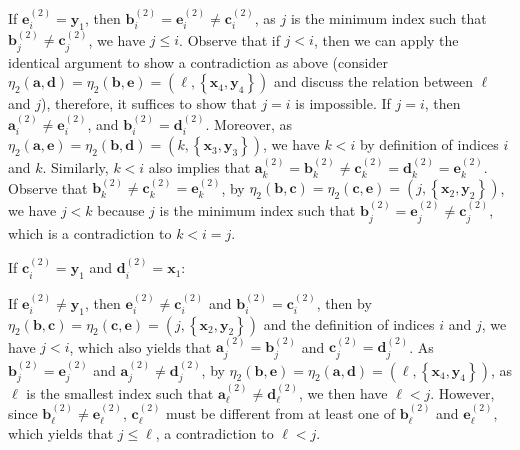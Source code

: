 \documentclass[11pt]{article}
\theoremstyle{definition}
\newcommand{\aaa}{\boldsymbol{a}}
\newcommand{\bb}{\boldsymbol{b}}
\newcommand{\cc}{\boldsymbol{c}}
\newcommand{\dd}{\boldsymbol{d}}
\newcommand{\ee}{\boldsymbol{e}}
\begin{document}
\begin{Case}
\begin{Case}
        
        \item If $\ee_{i}^{(2)}=\boldsymbol{y}_{1}$, then $\bb_{i}^{(2)}=\ee_{i}^{(2)}\neq\cc_{i}^{(2)}$, as $j$ is the minimum index such that $\bb_{j}^{(2)}\neq\cc_{j}^{(2)}$, we have $j\le i$. Observe that if $j<i$, then we can apply the identical argument to show a contradiction as above (consider $\eta_{2}(\aaa,\dd)=\eta_{2}(\bb,\ee)=(\ell,\left\{\boldsymbol{x}_{4},\boldsymbol{y}_{4}\right\})$ and discuss the relation between $\ell$ and $j$), therefore, it suffices to show that $j=i$ is impossible. If $j=i$, then $\aaa_{i}^{(2)}\neq  \ee_{i}^{(2)}$, and $\bb_{i}^{(2)}=\dd_{i}^{(2)}$. Moreover, as $\eta_{2}(\aaa,\ee)=\eta_{2}(\bb,\dd)=(k,\left\{\boldsymbol{x}_{3},\boldsymbol{y}_{3}\right\})$, we have $k<i$ by definition of indices $i$ and $k$. Similarly, $k<i$ also implies that $\aaa_{k}^{(2)}=\bb_{k}^{(2)}\neq \cc_{k}^{(2)}=\dd_{k}^{(2)}=\ee_{k}^{(2)}$. Observe that $\bb_{k}^{(2)}\neq\cc_{k}^{(2)}=\ee_{k}^{(2)}$, by $\eta_{2}(\bb,\cc)=\eta_{2}(\cc,\ee)=(j,\left\{\boldsymbol{x}_{2},\boldsymbol{y}_{2}\right\})$, we have $j<k$ because $j$ is the minimum index such that $\bb_{j}^{(2)}=\ee_{j}^{(2)}\neq\cc_{j}^{(2)}$, which is a contradiction to $k<i=j$.
    \end{Case}

    \item If $\cc_{i}^{(2)}=\boldsymbol{y}_{1}$ and $\dd_{i}^{(2)}=\boldsymbol{x}_{1}$: 
    \begin{Case}
        \item If $\ee_{i}^{(2)}\neq\boldsymbol{y}_{1}$, then $\ee_{i}^{(2)}\neq\cc_{i}^{(2)}$ and $\bb_{i}^{(2)}=\cc_{i}^{(2)}$, then by $\eta_{2}(\bb,\cc)=\eta_{2}(\cc,\ee)=(j,\left\{\boldsymbol{x}_{2},\boldsymbol{y}_{2}\right\})$ and the definition of indices $i$ and $j$, we have $j<i$, which also yields that $\aaa_{j}^{(2)}=\bb_{j}^{(2)}$ and $\cc_{j}^{(2)}=\dd_{j}^{(2)}$. As $\bb_{j}^{(2)}=\ee_{j}^{(2)}$ and $\aaa_{j}^{(2)}\neq \dd_{j}^{(2)}$, by $\eta_{2}(\bb,\ee)=\eta_{2}(\aaa,\dd)=(\ell,\left\{\boldsymbol{x}_{4},\boldsymbol{y}_{4}\right\})$, as $\ell$ is the smallest index such that $\aaa_{\ell}^{(2)}\neq \dd_{\ell}^{(2)}$, we then have $\ell<j$. However, since $\bb_{\ell}^{(2)}\neq \ee_{\ell}^{(2)}$, $\cc_{\ell}^{(2)}$ must be different from at least one of $\bb_{\ell}^{(2)}$ and $\ee_{\ell}^{(2)}$, which yields that $j\le \ell$, a contradiction to $\ell<j$.
        

\end{Case}
\end{Case}
\end{document}
